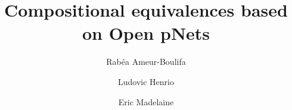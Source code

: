 \documentclass{lmcs}
\begin{document}
\title{Compositional equivalences based on Open pNets
}
\author{Rab\'ea Ameur-Boulifa}
\address{LTCI, T\'el\'ecom Paris, Institut Polytechnique de Paris, France
}         

\author{Ludovic Henrio}
\address{Univ Lyon, EnsL, UCBL, CNRS, Inria,  LIP, F-69342, LYON Cedex 07, France.}

\author{Eric Madelaine}
\address{INRIA Sophia Antipolis M\'edit\'erann\'ee, UCA, BP 93, 06902 Sophia Antipolis, France}

\end{document}
